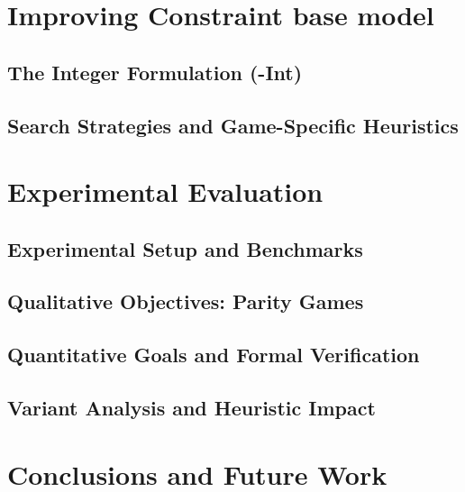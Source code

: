 \documentclass[preprint,12pt,authoryear]{elsarticle}
\begin{document}
\section{Improving Constraint base model}\label{sec:improved_cp}
\subsection{The Integer Formulation (\noc-Int)}\label{subsec:noc_int}
\subsection{Search Strategies and Game-Specific Heuristics}\label{subsec:search_heuristics}

\section{Experimental Evaluation}\label{sec:experiments}

\subsection{Experimental Setup and Benchmarks}\label{subsec:exp_setup}
\subsection{Qualitative Objectives: Parity Games}\label{subsec:exp_parity}
\subsection{Quantitative Goals and Formal Verification}\label{subsec:exp_quantitative}
\subsection{Variant Analysis and Heuristic Impact}\label{subsec:ablation_study}

\section{Conclusions and Future Work}\label{sec:conclusion}

\newpage
 

\end{document}
